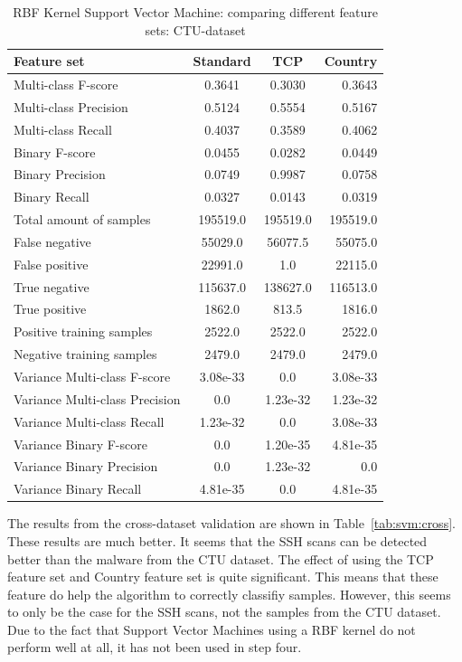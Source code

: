 \begin{table}[H]
\caption{RBF Kernel Support Vector Machine: comparing different feature sets: CTU-dataset}
\label{tab:svm:ctu}
\centering
\begin{tabular}{l c c r}
\toprule
Feature set & Standard & TCP & Country \\
\midrule
Multi-class F-score & 0.3641 & 0.3030 & 0.3643 \\
Multi-class Precision & 0.5124 & 0.5554 & 0.5167 \\
Multi-class Recall & 0.4037 & 0.3589 & 0.4062 \\
\midrule
Binary F-score & 0.0455 & 0.0282 & 0.0449 \\
Binary Precision & 0.0749 & 0.9987 & 0.0758 \\
Binary Recall & 0.0327 & 0.0143 & 0.0319 \\
\midrule
Total amount of samples & 195519.0 & 195519.0 & 195519.0 \\
False negative & 55029.0 & 56077.5 & 55075.0 \\
False positive & 22991.0 & 1.0 & 22115.0 \\
True negative & 115637.0 & 138627.0 & 116513.0 \\
True positive & 1862.0 & 813.5 & 1816.0\\
\midrule
Positive training samples & 2522.0 & 2522.0 & 2522.0\\
Negative training samples & 2479.0 & 2479.0 & 2479.0\\
\midrule
Variance Multi-class F-score & 3.08e-33 & 0.0 & 3.08e-33 \\
Variance Multi-class Precision & 0.0 & 1.23e-32 & 1.23e-32 \\
Variance Multi-class Recall & 1.23e-32 & 0.0 & 3.08e-33  \\
\midrule
Variance Binary F-score & 0.0 & 1.20e-35 & 4.81e-35 \\
Variance Binary Precision & 0.0 & 1.23e-32 & 0.0 \\
Variance Binary Recall & 4.81e-35 & 0.0 & 4.81e-35 \\
\bottomrule
\end{tabular}
\end{table}

\noindent The results from the cross-dataset validation are shown in Table~\ref{tab:svm:cross}. These results are much better. It seems that the SSH scans can
be detected better than the malware from the CTU dataset. The effect of using the TCP feature set and Country feature set is quite significant. This means that these feature do help the algorithm to correctly classifiy samples. However, this seems to only be the case for the SSH scans, not the samples from the CTU dataset. Due to the fact that Support Vector Machines using a RBF kernel do not perform well at all, it has not been used in step four.

